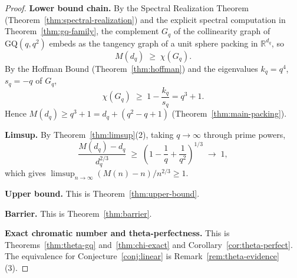 \documentclass{article}
\theoremstyle{definition}
\begin{document}
\begin{proof}
\textbf{Lower bound chain.}
By the Spectral Realization Theorem (Theorem~\ref{thm:spectral-realization}) and the explicit spectral computation in Theorem~\ref{thm:gq-family}, the complement $G_q$ of the collinearity graph of $\mathrm{GQ}(q,q^2)$ embeds as the tangency graph of a unit sphere packing in $\mathbb{R}^{d_q}$, so
\[
M(d_q)\;\ge\;\chi(G_q).
\]
By the Hoffman Bound (Theorem~\ref{thm:hoffman}) and the eigenvalues $k_q=q^4$, $s_q=-q$ of $G_q$,
\[
\chi(G_q)\;\ge\;1-\frac{k_q}{s_q}=q^3+1.
\]
Hence $M(d_q)\ge q^3+1 = d_q+(q^2-q+1)$ (Theorem~\ref{thm:main-packing}).

\textbf{Limsup.}
By Theorem~\ref{thm:limsup}(2), taking $q\to\infty$ through prime powers,
\[
\frac{M(d_q)-d_q}{d_q^{2/3}}\;\ge\;\left(1-\frac{1}{q}+\frac{1}{q^2}\right)^{1/3}\;\to\;1,
\]
which gives $\limsup_{n\to\infty}(M(n)-n)/n^{2/3}\ge 1$.

\textbf{Upper bound.}  This is Theorem~\ref{thm:upper-bound}.

\textbf{Barrier.}  This is Theorem~\ref{thm:barrier}.

\textbf{Exact chromatic number and theta-perfectness.}  This is Theorems~\ref{thm:theta-gq} and~\ref{thm:chi-exact} and Corollary~\ref{cor:theta-perfect}.  The equivalence for Conjecture~\ref{conj:linear} is Remark~\ref{rem:theta-evidence}(3).
\end{proof}
\end{document}
